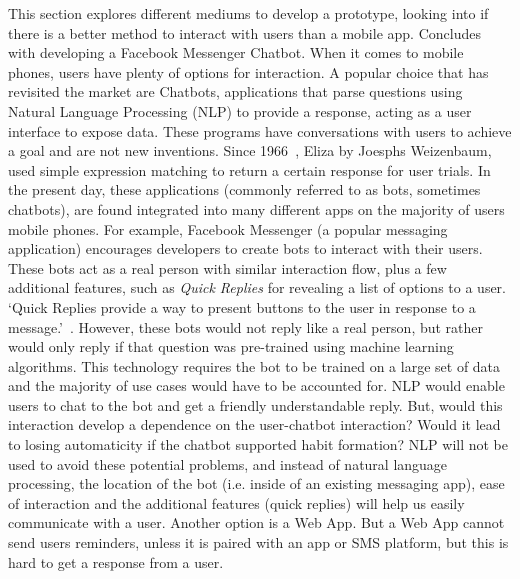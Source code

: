 This section explores different mediums to develop a prototype, looking into if there is a better method to interact with users than a mobile app. Concludes with developing a Facebook Messenger Chatbot.\newline
\newline
When it comes to mobile phones, users have plenty of options for interaction. A popular choice that has revisited the market are Chatbots, applications that parse questions using Natural Language Processing (NLP) to provide a response, acting as a user interface to expose data. These programs have conversations with users to achieve a goal and are not new inventions. Since 1966~\cite{article_eliza}, Eliza by Joesphs Weizenbaum, used simple expression matching to return a certain response for user trials. In the present day, these applications (commonly referred to as bots, sometimes chatbots), are found integrated into many different apps on the majority of users mobile phones. For example, Facebook Messenger (a popular messaging application) encourages developers to create bots to interact with their users. These bots act as a real person with similar interaction flow, plus a few additional features, such as \textit{Quick Replies} for revealing a list of options to a user. `Quick Replies provide a way to present buttons to the user in response to a message.'~\cite{doc_fb_quick_replies}. However, these bots would not reply like a real person, but rather would only reply if that question was pre-trained using machine learning algorithms. This technology requires the bot to be trained on a large set of data and the majority of use cases would have to be accounted for.\newline
\newline
NLP would enable users to chat to the bot and get a friendly understandable reply. But, would this interaction develop a dependence on the user-chatbot interaction? Would it lead to losing automaticity if the chatbot supported habit formation? NLP will not be used to avoid these potential problems, and instead of natural language processing, the location of the bot (i.e. inside of an existing messaging app), ease of interaction and the additional features (quick replies) will help us easily communicate with a user.\newline
\newline
Another option is a Web App. But a Web App cannot send users reminders, unless it is paired with an app or SMS platform, but this is hard to get a response from a user.\newline
